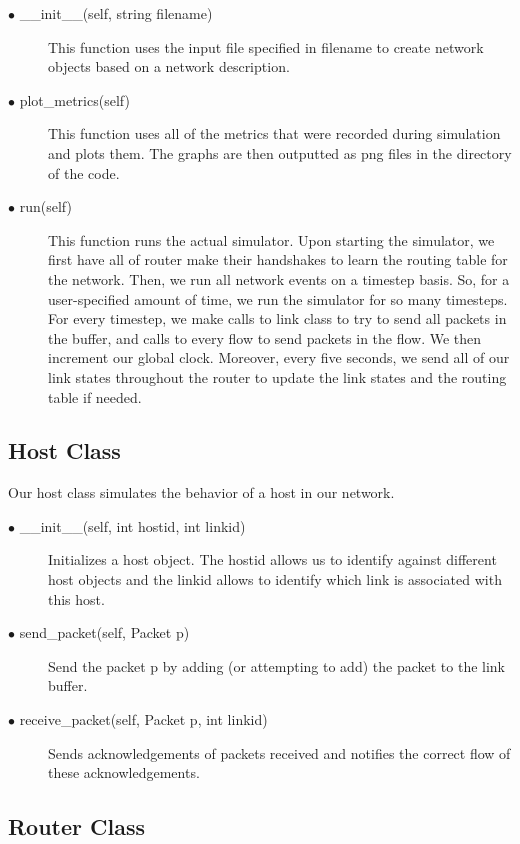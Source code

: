 \documentclass{article}
\begin{document}
\begin{description}
	\item[$\bullet$ \_\_init\_\_(self, string filename)] This function uses the input file specified in filename to create network objects based on a network description.
	\item[$\bullet$ plot\_metrics(self)] This function uses all of the metrics that were recorded during simulation and plots them. The graphs are then outputted as png files in the directory of the code.
	\item[$\bullet$ run(self)] This function runs the actual simulator. Upon starting the simulator, we first have all of router make their handshakes to learn the routing table for the network. Then, we run all network events on a timestep basis. So, for a user-specified amount of time, we run the simulator for so many timesteps. For every timestep, we make calls to link class to try to send all packets in the buffer, and calls to every flow to send packets in the flow. We then increment our global clock. Moreover, every five seconds, we send all of our link states throughout the router to update the link states and the routing table if needed.

\end{description}

\subsection{Host Class}

Our host class simulates the behavior of a host in our network.

\begin{description}
	\item [$\bullet$ \_\_init\_\_(self, int hostid, int linkid)] Initializes a host object. The hostid allows us to identify against different host objects and the linkid allows to identify which link is associated with this host.
	\item [$\bullet$ send\_packet(self, Packet p)] Send the packet p by adding (or attempting to add) the packet to the link buffer.
	\item [$\bullet$ receive\_packet(self, Packet p, int linkid)] Sends acknowledgements of packets received and notifies the correct flow of these acknowledgements.
\end{description}

\subsection{Router Class}
\end{document}
